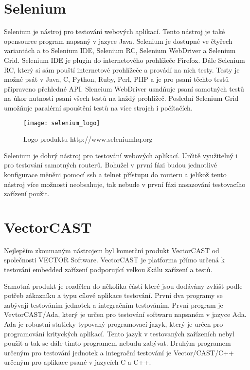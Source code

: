 \section{Selenium}
Selenium je nástroj pro testování webových aplikací. Tento nástroj je také opensource program napsaný v jazyce Java. Selenium je dostupné ve čtyřech variantách a to Selenium IDE, Selenium RC, Selenium WebDriver a Selenium Grid. Selenium IDE je plugin do internetového prohlížeče Firefox. Dále Selenium RC, který si sám pouští internetové prohlížeče a provádí na nich testy. Testy je možné psát v Java, C, Python, Ruby, Perl, PHP a je pro psaní těchto testů připraveno přehledné API. Sleneium WebDriver usndňuje psaní samotných testů na úkor nutnosti psaní všech testů na každý prohlížeč. Poslední Selenium Grid umožňuje paralérní spouštění testů na více strojch i počítačích.

\begin{figure}[h]
  \centering
  \texttt{[image: selenium\_logo]}
  \caption{Logo produktu http://www.seleniumhq.org}
  \label{fig:selenium_logo}
\end{figure}

Selenium je dobrý nástroj pro testování webových aplikací. Určitě využitelný i pro testování samotných routerů. Bohužel v první fázi budou jednotlivé konfigurace měněni pomocí ssh a telnet přístupu do routeru a jelikož tento nástroj více možností neobsahuje, tak nebude v první fázi nasazování testovacího zařízení použit.

\section{VectorCAST}
Nejlepším zkoumaným nástrojem byl komerční produkt VectorCAST od společnosti VECTOR Software. VectorCAST je platforma přímo určená k testování embedded zařízení podporující velkou škálu zařízení a testů.

Samotná produkt je rozdělen do několika částí které jsou dodávány zvlášť podle potřeb zákazníku a typu cílové aplikace testování. První dva programy se zabývají testováním jednotek a integračním testováním. První program je VevtorCAST/Ada, který je určen pro testování softwaru napsaném v jazyce Ada. Ada je robustní staticky typovaný programovací jazyk, který je určen pro programování krityckých aplikací. Tento jazyk v testovaných zařízeních nebyl použit a tak se dále tímto programem nebudu zabývat. Druhým programem určeným pro testování jednotek a integrační testování je Vector/CAST/C++ určeným pro aplikace psané v jazycích C a C++.

